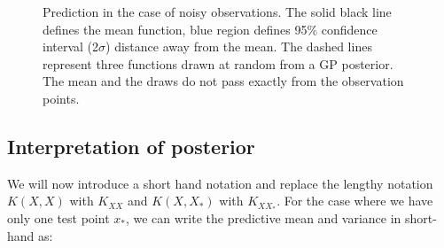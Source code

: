 \begin{figure}[!ht]
  \centering
    \quad
{}\quad
  
       \caption{Prediction in the case of noisy observations. The solid black line defines the mean function, blue region defines 95\% confidence interval (2$\sigma$) distance away from the mean. The dashed lines represent three functions drawn at random from a GP posterior. The mean and the draws do not pass exactly from the observation points.}
       \label{figGPNoisyPosteriors}
\end{figure}

\subsection{Interpretation of posterior}
We will now introduce a short hand notation and replace the lengthy notation $K(X, X)$ with $K_{XX}$ and $K(X, X_{*})$ with $K_{XX_{*}}$. For the case where we have only one test point $x_{*}$, we can write the predictive mean and variance in short-hand as:

